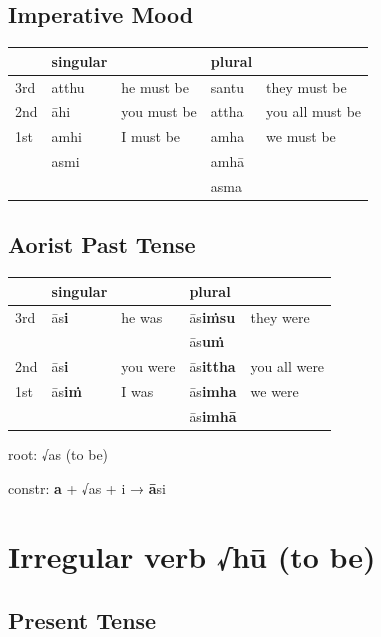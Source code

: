 \documentclass[11pt,oneside]{memoir}
\begin{document}
\subsection{Imperative Mood}
\label{sec:org7d3fb93}

\begin{center}
\begin{tabular}{lllll}
 & singular &  & plural & \\[0pt]
\hline
3rd & atthu & he must be & santu & they must be\\[0pt]
2nd & āhi & you must be & attha & you all must be\\[0pt]
1st & amhi & I must be & amha & we must be\\[0pt]
 & asmi &  & amhā & \\[0pt]
 &  &  & asma & \\[0pt]
\end{tabular}
\end{center}

\subsection{Aorist Past Tense}
\label{sec:orgb219ee5}

\begin{center}
\begin{tabular}{lllll}
 & singular &  & plural & \\[0pt]
\hline
3rd & ās\textbf{i} & he was & ās\textbf{iṁsu} & they were\\[0pt]
 &  &  & ās\textbf{uṁ} & \\[0pt]
2nd & ās\textbf{i} & you were & ās\textbf{ittha} & you all were\\[0pt]
1st & ās\textbf{iṁ} & I was & ās\textbf{imha} & we were\\[0pt]
 &  &  & ās\textbf{imhā} & \\[0pt]
\end{tabular}
\end{center}

root: √as (to be)

constr: \textbf{a} + √as + i → \textbf{ā}si

\clearpage

\section{Irregular verb √hū (to be)}
\label{sec:orgcfd45c4}
\subsection{Present Tense}
\label{sec:org5684d5d}
\end{document}
